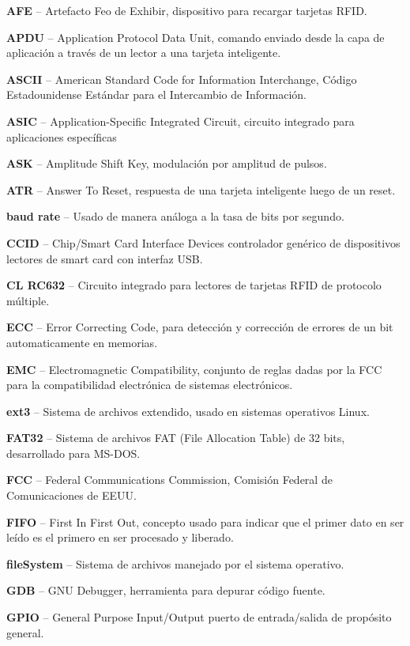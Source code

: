 \begin{glosario}

{\bf{AFE}} – Artefacto Feo de Exhibir, dispositivo para recargar tarjetas RFID.

{\bf{APDU}} – Application Protocol Data Unit, comando enviado desde la capa de aplicación a través de un lector a una tarjeta inteligente.

{\bf{ASCII}} – American Standard Code for Information Interchange, Código Estadounidense Estándar para el Intercambio de Información.

{\bf{ASIC}} – Application-Specific Integrated Circuit, circuito integrado para aplicaciones específicas

{\bf{ASK}} – Amplitude Shift Key, modulación por amplitud de pulsos.

{\bf{ATR}} – Answer To Reset, respuesta de una tarjeta inteligente luego de un reset.

{\bf{baud rate}} – Usado de manera análoga a la tasa de bits por segundo.

{\bf{CCID}} – Chip/Smart Card Interface Devices controlador genérico de dispositivos lectores de smart card con interfaz USB.

{\bf{CL RC632}} – Circuito integrado para lectores de tarjetas RFID de protocolo múltiple.

{\bf{ECC}} – Error Correcting Code, para detección y corrección de errores de un bit automaticamente en memorias.

{\bf{EMC}} – Electromagnetic Compatibility, conjunto de reglas dadas por la FCC para la compatibilidad electrónica de sistemas electrónicos.

{\bf{ext3}} – Sistema de archivos extendido, usado en sistemas operativos Linux.

{\bf{FAT32}} – Sistema de archivos FAT (File Allocation Table) de 32 bits, desarrollado para MS-DOS.

{\bf{FCC}} – Federal Communications Commission, Comisión Federal de Comunicaciones de EEUU.

{\bf{FIFO}}  – First In First Out, concepto usado para indicar que el primer dato en ser leído es el primero en ser procesado y liberado.

{\bf{fileSystem}} – Sistema de archivos manejado por el sistema operativo.

{\bf{GDB}} – GNU Debugger,  herramienta para depurar código fuente.

{\bf{GPIO}} – General Purpose Input/Output  puerto de entrada/salida de propósito general.


\end{glosario}
